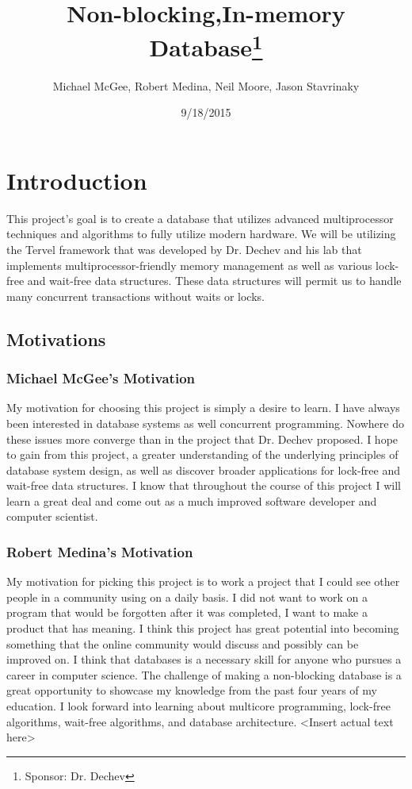 \documentclass[letterpaper]{article}
\title{Non-blocking,In-memory Database\thanks{Sponsor: Dr. Dechev}}
\author{Michael McGee, Robert Medina, Neil Moore, Jason Stavrinaky}
\date{9/18/2015}
\begin{document}
  \maketitle
  \newpage

  \section{Introduction}
  This project's goal is to create a database that utilizes advanced multiprocessor techniques and algorithms to fully utilize modern hardware.
  We will be utilizing the Tervel framework that was developed by Dr. Dechev and his lab that implements multiprocessor-friendly memory management
  as well as various lock-free and wait-free data structures. These data structures will permit us to handle many concurrent transactions without 
  waits or locks.
  
  \subsection{Motivations}
  \subsubsection{Michael McGee's Motivation}
  My motivation for choosing this project is simply a desire to learn. I have always been interested in database systems as well concurrent programming. Nowhere do these issues more converge than in the project that Dr. Dechev proposed.  
  I hope to gain from this project, a greater understanding of the underlying principles of database system design, as well as discover broader applications for lock-free and wait-free data structures. I know that throughout the course of this project I will learn a great deal and come out as a much improved software developer and computer scientist.  
  \subsubsection{Robert Medina's Motivation}
  My motivation for picking this project is to work a project that I could see other people in a community using on a daily basis. I did not want to work on a program that would be 
  forgotten after it was completed, I want to make a product that has meaning. I think this project has great potential into becoming something that the online community would discuss 
  and possibly can be improved on. I think that databases is a necessary skill for anyone who pursues a career in computer science. The challenge of making a non-blocking database is 
  a great opportunity to showcase my knowledge from the past four years of my education. I look forward into learning about multicore programming, lock-free algorithms, wait-free algorithms,
  and database architecture.
  \textless Insert actual text here\textgreater
\end{document}
